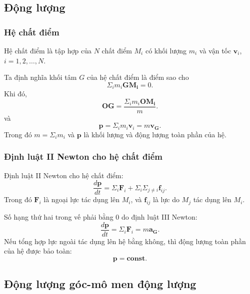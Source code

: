 \subsection{Động lượng}
\begin{frame}
    \frametitle{Hệ chất điểm}
    Hệ chất điểm là tập hợp của \(N\) chất điểm \(M_i\) có khối lượng \(m_i\) và vận tốc \(\mathbf{v}_i\), \(i=1,2,\ldots,N\).

    Ta định nghĩa khối tâm \(G\) của hệ chất điểm là điểm sao cho
    \begin{equation}
    \Sigma_i m_i \mathbf{GM_i} = 0.
    \end{equation}
    Khi đó,
    \begin{equation}
    \mathbf{OG} = \frac{\Sigma_i m_i \mathbf{OM_i}}{m}.
    \end{equation}
    và
    \begin{equation}
        \mathbf p=\Sigma_i m_i \mathbf{v}_i = m\mathbf{v_G}.
    \end{equation}
    Trong đó \(m=\Sigma_i m_i\) và \(\mathbf p\) là khối lượng và động lượng toàn phần của hệ.
\end{frame}

\begin{frame}
    \frametitle{Định luật II Newton cho hệ chất điểm}
    Định luật II Newton cho hệ chất điểm:
    \begin{equation}
        \frac{d\mathbf p}{dt} = \Sigma_i \mathbf{F}_i + \Sigma_i \Sigma_{j\neq i} \mathbf{f}_{ij}.
    \end{equation}
    Trong đó \(\mathbf{F}_i\) là ngoại lực tác dụng lên \(M_i\), và \(\mathbf{f}_{ij}\) là lực do \(M_j\) tác dụng lên \(M_i\).

    Số hạng thứ hai trong vế phải bằng 0 do định luật III Newton:
    \begin{equation}
        \frac{d\mathbf p}{dt}=\Sigma_i \mathbf{F}_i=m\mathbf{a_G}.
    \end{equation}
    Nếu tổng hợp lực ngoài tác dụng lên hệ bằng không, thì động lượng toàn phần của hệ được bảo toàn:
        \begin{equation}
            \mathbf p = \textbf{const}.
        \end{equation}
\end{frame}
\subsection{Động lượng góc-mô men động lượng}

